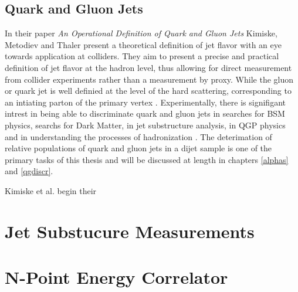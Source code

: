 \subsection{Quark and Gluon Jets}	
	In their paper \textit{An Operational Definition of Quark and Gluon Jets} \cite{Komiske2018} Kimiske, Metodiev and Thaler present a theoretical definition of jet flavor with an eye towards application at colliders. 
	They aim to present a precise and practical definition of jet flavor at the hadron level, thus allowing for direct measurement from collider experiments rather than a measurement by proxy. 
	While the gluon or quark jet is well definied at the level of the hard scattering, corresponding to an intiating parton of the primary vertex \cite{Jones1989} \cite{Fodor1990}. 
	Experimentally, there is signifigant intrest in being able to discriminate quark and gluon jets in searches for BSM physics, searchs for Dark Matter, in jet substructure analysis, in QGP physics and in understanding the processes of hadronization \cite{Gallicchio2011}\cite{Lima2017}\cite{Bhattecherjee2017}\cite{}. 
	The deterimation of relative populations of quark and gluon jets in a dijet sample is one of the primary tasks of this thesis and will be discussed at length in chapters \ref{alphas} and \ref{qgdiscr}. 

	Kimiske et al. begin their 
\section{Jet Substucure Measurements}

\section{N-Point Energy Correlator}
%

